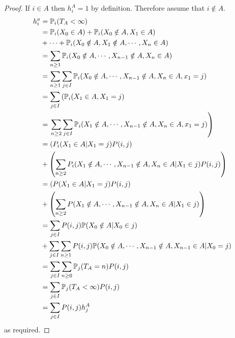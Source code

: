 \documentclass[../Main.tex]{subfiles}
\begin{document}
\begin{proof}
    If $i \in A$ then $h_i^A = 1$ by definition. Therefore assume that $i \notin A$.
    \begin{align*}
        h_i^a &= \P_i(T_A < \infty) \\
        &= \P_i(X_0 \in A) + \P_i(X_0 \notin A, X_1 \in A) \\
        &+ \cdots + \P_i(X_0 \notin A, X_1 \notin A, \cdots, X_n \in A) \\
        &= \sum_{n \geq 1} \P_i(X_0 \notin A, \cdots, X_{n-1} \notin A, X_n \in A) \\
        &= \sum_{n \geq 1} \sum_{j \in I}\P_i (X_0 \notin A, \cdots, X_{n-1} \notin A, X_n \in A, x_1 = j) \\
        &= \sum_{j \in I} \left(\P_i(X_1 \in A, X_1 = j) \right. \\
        &= \left.\sum_{n \geq 2} \sum_{j \in I}\P_i (X_1 \notin A, \cdots, X_{n-1} \notin A, X_n \in A, x_1 = j)\right) \\
        &= \left(P_i(X_1 \in A | X_1 = j) P(i, j)\right. \\
        &+ \left(\sum_{n\geq 2} P_i(X_1 \notin A, \cdots, X_{n-1} \notin A, X_n \in A | X_1 \in j)P(i, j)\right) \\
        &= \left(P(X_1 \in A | X_1 = j) P(i, j)\right. \\
        &+ \left(\sum_{n\geq 2} P(X_1 \notin A, \cdots, X_{n-1} \notin A, X_n \in A | X_1 \in j)\right) \\
        &= \sum_{j \in I} P(i, j) \P(X_0 \notin A | X_0 \in j) \\
        &+ \sum_{j \in I} \sum_{n \geq 1} P(i, j) \P(X_0 \notin A, \cdots, X_{n-1} \notin A, X_{n-1} \in A | X_0 = j) \\
        &= \sum_{j \in I} \sum_{n \geq 0} \P_j(T_A = n) P(i, j) \\
        &= \sum_{j \in I} \P_j(T_A < \infty) P(i, j) \\
        &= \sum_{j \in I} P(i, j) h_j^A
    \end{align*}
    as required.


\end{proof}
\end{document}
